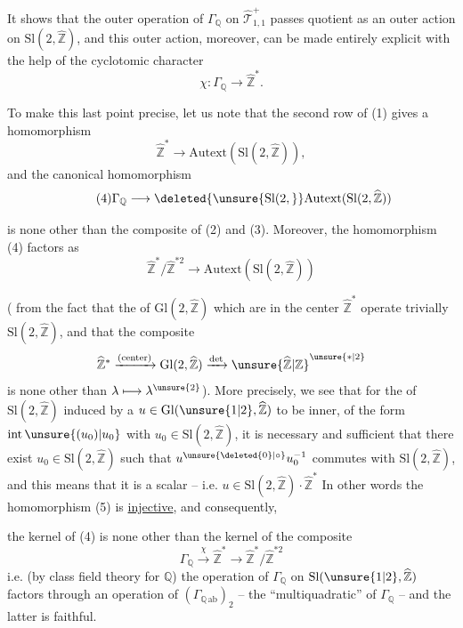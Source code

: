 It shows that the outer operation of
$\Gamma_{\mathbb Q}$ on $\widehat{\mathcal T}_{1,1}^{+}$
passes  quotient as an
outer action on $\mathrm{Sl}(2,\widehat{\mathbb Z})$, and this
outer action, moreover, can be made
entirely explicit with the help of the
cyclotomic character
\[
\tag{2}
\chi : \Gamma_{\mathbb Q}\longrightarrow \widehat{\mathbb Z}^{*}.
\]

To make this last point precise, let us note
that the second row of (1) gives
a homomorphism
\[
\tag{3}
\widehat{\mathbb Z}^{*}\longrightarrow
\mathrm{Autext}(\mathrm{Sl}(2,\widehat{\mathbb Z})),
\]
and the canonical homomorphism
\[
\tag{4}
\Gamma_{\mathbb Q}\longrightarrow
\deleted{\unsure{\mathrm{Sl}(2,}}
\mathrm{Autext}(\mathrm{Sl}(2,\widehat{\mathbb Z}))
\]


is none other than the composite of (2) and (3).
Moreover, the homomorphism (4) factors
as
\[
\tag{5}
\widehat{\mathbb Z}^{*}/\widehat{\mathbb Z}^{*2}
\longrightarrow \mathrm{Autext}(\mathrm{Sl}(2,\widehat{\mathbb Z}))
\]

( from the fact that the  of
$\mathrm{Gl}(2,\widehat{\mathbb Z})$ which are in the center
$\widehat{\mathbb Z}^{*}$ operate trivially
 $\mathrm{Sl}(2,\widehat{\mathbb Z})$,
and that the composite
\[
\widehat{\mathbb Z}^{*}\xrightarrow{\text{(center)}}
\mathrm{Gl}(2,\widehat{\mathbb Z})\xrightarrow{\det}
\unsure{\widehat{\mathbb Z}|\mathbb Z}^{\unsure{*|2}}
\]
is none other than $\lambda\longmapsto\lambda^{\unsure{2}}$). More
precisely, we see that for the
 of $\mathrm{Sl}(2,\widehat{\mathbb Z})$ induced by a
$u\in\mathrm{Gl}(\unsure{1|2},\widehat{\mathbb Z})$ to be inner,
 of the form
$\mathrm{int}\,\unsure{(u_0)|u_0}$ with $u_0\in\mathrm{Sl}(2,\widehat{\mathbb Z})$, it is necessary and sufficient
that there exist $u_0\in\mathrm{Sl}(2,\widehat{\mathbb Z})$ such that
$u^{\unsure{\deleted{0}|\circ}}u_0^{-1}$ commutes with $\mathrm{Sl}(2,\widehat{\mathbb Z})$, and this means
that it is a scalar -- i.e.
$u\in\mathrm{Sl}(2,\widehat{\mathbb Z})\cdot\widehat{\mathbb Z}^{*}$
In other words
the homomorphism (5) is \uline{injective}, and consequently,


the kernel of (4) is none other than the
kernel of the composite
\[
\tag{6}
\Gamma_{\mathbb Q}\xrightarrow{\chi}\widehat{\mathbb Z}^{*}
\longrightarrow\widehat{\mathbb Z}^{*}/\widehat{\mathbb Z}^{*2}
\]
i.e. (by class field theory for
$\mathbb Q$) the  operation of $\Gamma_{\mathbb Q}$ on
$\mathrm{Sl}(\unsure{1|2},\widehat{\mathbb Z})$ factors
through an  operation of
$(\Gamma_{\mathbb Q\,\mathrm{ab}})_2$ -- the
``multiquadratic''  of $\Gamma_{\mathbb Q}$ -- and the
latter is faithful.

